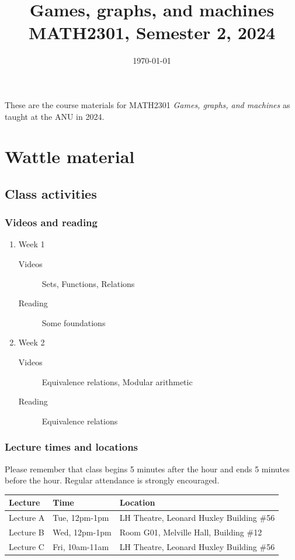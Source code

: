 \documentclass{amsart}
\date{\today}
\title{Games, graphs, and machines\\\medskip
\large MATH2301, Semester 2, 2024}
\begin{document}
\maketitle

These are the course materials for MATH2301 \emph{Games, graphs, and machines} as taught at the ANU in 2024.
\section{Wattle material}
\label{sec:org0aedd84}
\subsection{Class activities}
\label{sec:org2d79429}

\subsubsection{Videos and reading}
\label{sec:org47060f4}
\begin{enumerate}
\item Week 1
\begin{description}
\item[{Videos}] Sets, Functions, Relations
\item[{Reading}] Some foundations
\end{description}

\item Week 2
\begin{description}
\item[{Videos}] Equivalence relations, Modular arithmetic

\item[{Reading}] Equivalence relations
\end{description}
\end{enumerate}
\subsubsection{Lecture times and locations}
\label{sec:org9ef888b}

Please remember that class begins 5 minutes after the hour and ends 5 minutes before the hour.
Regular attendance is strongly encouraged.

\begin{center}
\begin{tabular}{lll}
Lecture & Time & Location\\
\hline
Lecture A & Tue, 12pm-1pm & LH Theatre, Leonard Huxley Building \#56\\
Lecture B & Wed, 12pm-1pm & Room G01, Melville Hall, Building \#12\\
Lecture C & Fri, 10am-11am & LH Theatre, Leonard Huxley Building \#56\\
\end{tabular}
\end{center}
\end{document}
